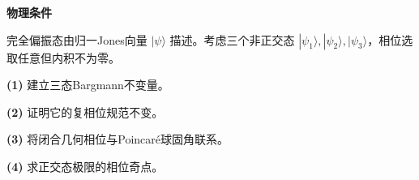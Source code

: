\textbf{物理条件}\par 完全偏振态由归一Jones向量 \(|\psi\rangle\) 描述。考虑三个非正交态 \(|\psi_1\rangle,|\psi_2\rangle,|\psi_3\rangle\)，相位选取任意但内积不为零。
\par\noindent\textbf{(1)} 建立三态Bargmann不变量。
\par\noindent\textbf{(2)} 证明它的复相位规范不变。
\par\noindent\textbf{(3)} 将闭合几何相位与Poincaré球固角联系。
\par\noindent\textbf{(4)} 求正交态极限的相位奇点。
